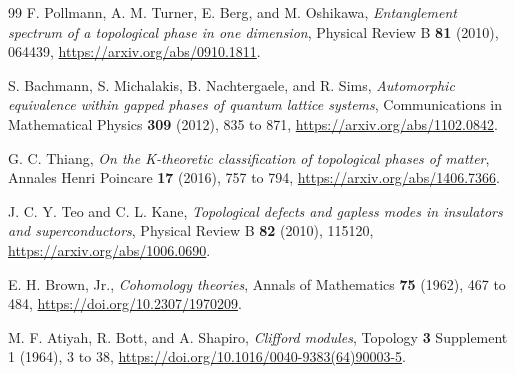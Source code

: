 \documentclass[12pt]{article}
\theoremstyle{definition}
\theoremstyle{remark}
\begin{document}
\begin{thebibliography}{99}
F. Pollmann, A. M. Turner, E. Berg, and M. Oshikawa,
\emph{Entanglement spectrum of a topological phase in one dimension},
Physical Review B \textbf{81} (2010), 064439,
\url{https://arxiv.org/abs/0910.1811}.

S. Bachmann, S. Michalakis, B. Nachtergaele, and R. Sims,
\emph{Automorphic equivalence within gapped phases of quantum lattice
systems},
Communications in Mathematical Physics \textbf{309} (2012), 835 to 871,
\url{https://arxiv.org/abs/1102.0842}.

G. C. Thiang,
\emph{On the K-theoretic classification of topological phases of matter},
Annales Henri Poincare \textbf{17} (2016), 757 to 794,
\url{https://arxiv.org/abs/1406.7366}.

J. C. Y. Teo and C. L. Kane,
\emph{Topological defects and gapless modes in insulators and
superconductors},
Physical Review B \textbf{82} (2010), 115120,
\url{https://arxiv.org/abs/1006.0690}.

E. H. Brown, Jr.,
\emph{Cohomology theories},
Annals of Mathematics \textbf{75} (1962), 467 to 484,
\url{https://doi.org/10.2307/1970209}.

M. F. Atiyah, R. Bott, and A. Shapiro,
\emph{Clifford modules},
Topology \textbf{3} Supplement 1 (1964), 3 to 38,
\url{https://doi.org/10.1016/0040-9383(64)90003-5}.

\end{thebibliography}
\end{document}

